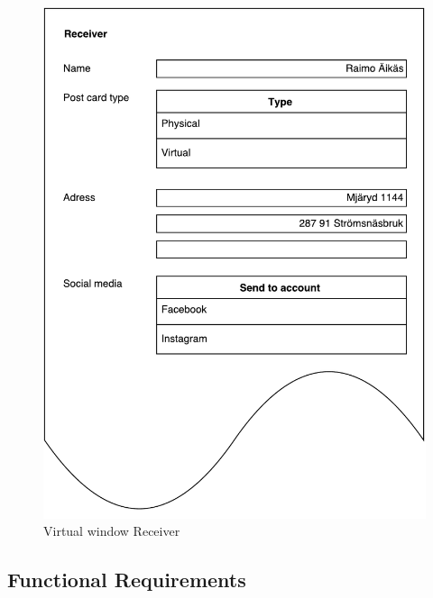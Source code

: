 \documentclass[10pt,a4paper]{article}
\begin{document}
\begin{centering}
\begin{figure}[!ht]
\begin{minipage}{0.3\textwidth}
\includegraphics[width=\linewidth]{Data_figures/virtualwindows_receiver.pdf}
\caption{Virtual window Receiver}
\label{fig:virtualwindows_receiver}
\end{minipage}

\end{figure}
\end{centering}

\subsection{Functional Requirements}
\end{document}
